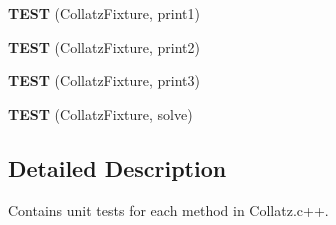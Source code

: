 \begin{DoxyCompactItemize}
\item 
\hypertarget{TestCollatz_8c_09_09_a7ff0f20b9076fc1762bec9d580e29238}{{\bfseries T\-E\-S\-T} (Collatz\-Fixture, print1)}\label{TestCollatz_8c_09_09_a7ff0f20b9076fc1762bec9d580e29238}

\item 
\hypertarget{TestCollatz_8c_09_09_a99f7dd94c98bff5b2e206c364d57e917}{{\bfseries T\-E\-S\-T} (Collatz\-Fixture, print2)}\label{TestCollatz_8c_09_09_a99f7dd94c98bff5b2e206c364d57e917}

\item 
\hypertarget{TestCollatz_8c_09_09_a9715f206e9057726135c3e1d34f00f87}{{\bfseries T\-E\-S\-T} (Collatz\-Fixture, print3)}\label{TestCollatz_8c_09_09_a9715f206e9057726135c3e1d34f00f87}

\item 
\hypertarget{TestCollatz_8c_09_09_a07f06cda216730b4038ffd06db5a3d1f}{{\bfseries T\-E\-S\-T} (Collatz\-Fixture, solve)}\label{TestCollatz_8c_09_09_a07f06cda216730b4038ffd06db5a3d1f}

\end{DoxyCompactItemize}


\subsection{Detailed Description}
Contains unit tests for each method in Collatz.\-c++. 